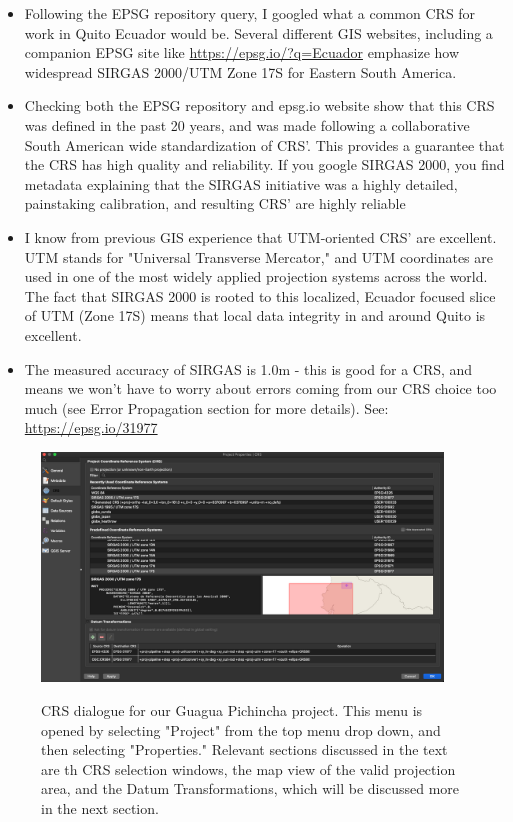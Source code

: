 \documentclass{article}
\begin{document}
\begin{itemize}
    \item Following the EPSG repository query, I googled what a common CRS for work in Quito Ecuador would be. Several different GIS websites, including a companion EPSG site like \url{https://epsg.io/?q=Ecuador} emphasize how widespread SIRGAS 2000/UTM Zone 17S for Eastern South America. 
    \item Checking both the EPSG repository and epsg.io website show that this CRS was defined in the past 20 years, and was made following a collaborative South American wide standardization of CRS'. This provides a guarantee that the CRS has high quality and reliability. If you google SIRGAS 2000, you find metadata explaining that the SIRGAS initiative was a highly detailed, painstaking calibration, and resulting CRS' are highly reliable
    \item I know from previous GIS experience that UTM-oriented CRS' are excellent. UTM stands for "Universal Transverse Mercator," and UTM coordinates are used in one of the most widely applied projection systems across the world. The fact that SIRGAS 2000 is rooted to this localized, Ecuador focused slice of UTM (Zone 17S) means that local data integrity in and around Quito is excellent. 
    \item The measured accuracy of SIRGAS is 1.0m - this is good for a CRS, and means we won't have to worry about errors coming from our CRS choice too much (see Error Propagation section for more details). See: \url{https://epsg.io/31977}
\end{itemize}

\begin{figure}[htbp]
    \centering
    \includegraphics[width=0.95\textwidth]{FIg_16_proj_crs.png}
    \label{fig13}
    \caption{CRS dialogue for our Guagua Pichincha project. This menu is opened by selecting "Project" from the top menu drop down, and then selecting "Properties." Relevant sections discussed in the text are th CRS selection windows, the map view of the valid projection area, and the Datum Transformations, which will be discussed more in the next section.}
\end{figure}
\end{document}
